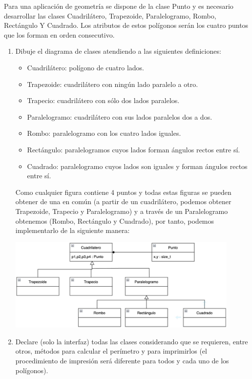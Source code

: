 \newpage
{} Para una aplicación de geometría se dispone de la clase Punto y es necesario desarrollar las clases Cuadrilátero, Trapezoide, Paralelogramo, Rombo, Rectángulo Y Cuadrado. Los atributos de estos polígonos serán los cuatro puntos que los forman en orden consecutivo.
\begin{enumerate}[label = \alph*)]
  \item Dibuje el diagrama de clases atendiendo a las siguientes definiciones:
  \begin{itemize}
    \item Cuadrilátero: polígono de cuatro lados.
    \item Trapezoide: cuadrilátero con ningún lado paralelo a otro.
    \item Trapecio: cuadrilátero con sólo dos lados paralelos.
    \item Paralelogramo: cuadrilátero con sus lados paralelos dos a dos.
    \item Rombo: paralelogramo con los cuatro lados iguales.
    \item Rectángulo: paralelogramos cuyos lados forman ángulos rectos entre sí.
    \item Cuadrado: paralelogramo cuyos lados son iguales y forman ángulos rectos entre sí.
  \end{itemize}

  Como cualquier figura contiene 4 puntos y todas estas figuras se pueden obtener de una en común (a partir de un cuadrilátero, podemos obtener Trapezoide, Trapecio y Paralelogramo) y a través de un Paralelogramo obtenemos (Rombo, Rectángulo y Cuadrado), por tanto, podemos implementarlo de la siguiente manera:
  \begin{center}
    \includegraphics[width=0.9\textwidth]{assets/WhatsApp Image 2024-06-14 at 20.28.31.jpeg}
  \end{center}
  \item Declare (solo la interfaz) todas las clases considerando que se requieren, entre otros, métodos para calcular el perímetro y para imprimirlos (el procedimiento de impresión será diferente para todos y cada uno de los polígonos).
  

\end{enumerate}
